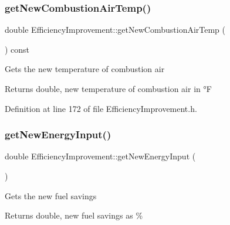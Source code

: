 \subsubsection{\texorpdfstring{get\+New\+Combustion\+Air\+Temp()}{getNewCombustionAirTemp()}\hspace{0.1cm}{\footnotesize\ttfamily [3/3]}}
{\footnotesize\ttfamily double Efficiency\+Improvement\+::get\+New\+Combustion\+Air\+Temp (\begin{DoxyParamCaption}{ }\end{DoxyParamCaption}) const\hspace{0.3cm}{\ttfamily [inline]}}

Gets the new temperature of combustion air

\begin{DoxyReturn}{Returns}
double, new temperature of combustion air in °F 
\end{DoxyReturn}


Definition at line 172 of file Efficiency\+Improvement.\+h.

\mbox{\label{class_efficiency_improvement_a3c31caaed812edb8c465b53dc9029810}} 
\subsubsection{\texorpdfstring{get\+New\+Energy\+Input()}{getNewEnergyInput()}\hspace{0.1cm}{\footnotesize\ttfamily [1/3]}}
{\footnotesize\ttfamily double Efficiency\+Improvement\+::get\+New\+Energy\+Input (\begin{DoxyParamCaption}{ }\end{DoxyParamCaption})}

Gets the new fuel savings

\begin{DoxyReturn}{Returns}
double, new fuel savings as \% 
\end{DoxyReturn}
\mbox{\label{class_efficiency_improvement_a3c31caaed812edb8c465b53dc9029810}} 
